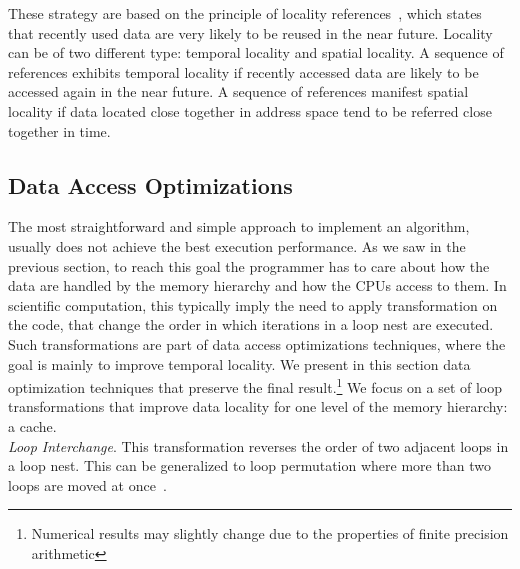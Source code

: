 These strategy are based on the principle of locality references~\cite{Hennessy-Patterson}, which states that recently used data are very likely to be reused in the near future. Locality can be of two different type: temporal locality and spatial locality. A sequence of references exhibits temporal locality if recently accessed data are likely to be accessed again in the near future. A sequence of references manifest spatial locality if data located close together in address space tend to be referred close together in time.

\subsection{Data Access Optimizations}
The most straightforward and simple approach to implement an algorithm, usually does not achieve the best execution performance. As we saw in the previous section, to reach this goal the programmer has to care about how the data are handled by the memory hierarchy and how the CPUs access to them. In scientific computation, this typically imply the need to apply transformation on the code, that change the order in which iterations in a loop nest are executed. Such transformations are part of data access optimizations techniques, where the goal is mainly to improve temporal locality. We present in this section data optimization techniques that preserve the final result.\footnote{Numerical results may slightly change due to the properties of finite precision arithmetic} We focus on a set of loop transformations that improve data locality for one level of the memory hierarchy: a cache.
\\

\noindent \textit{Loop Interchange}. This transformation reverses the order of two adjacent loops in a loop nest. This can be generalized to loop permutation where more than two loops are moved at once~\citep{Kennedy:2001:OCM:502981,Wolfe:1995:HPC:572937}.

